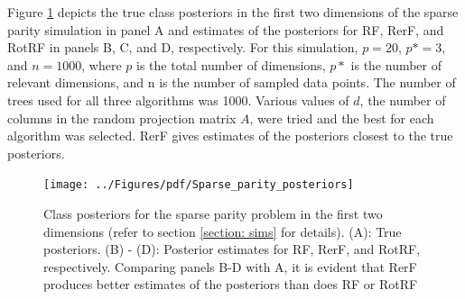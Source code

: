 \documentclass[10pt]{article}
\begin{document}
Figure \ref{posteriors} depicts the true class posteriors in the first two dimensions of the sparse parity simulation in panel A and estimates of the posteriors for RF, RerF, and RotRF in panels B, C, and D, respectively. For this simulation, $p = 20$, $p* = 3$, and $n = 1000$, where $p$ is the total number of dimensions, $p*$ is the number of relevant dimensions, and n is the number of sampled data points. The number of trees used for all three algorithms was 1000. Various values of $d$, the number of columns in the random projection matrix $A$, were tried and the best for each algorithm was selected. RerF gives estimates of the posteriors closest to the true posteriors. 

\begin{figure}[ht]
\vskip 0.2in
\begin{center}
\centerline{\texttt{[image: ../Figures/pdf/Sparse\_parity\_posteriors]}}
\caption{Class posteriors for the sparse parity problem in the first two dimensions (refer to section \ref{section: sims} for details). (A): True posteriors. (B) - (D): Posterior estimates for RF, RerF, and RotRF, respectively. Comparing panels B-D with A, it is evident that RerF produces better estimates of the posteriors than does RF or RotRF}
\label{posteriors}
\end{center}
\vskip -0.2in
\end{figure}
\end{document}
